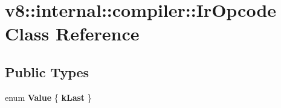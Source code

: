 \hypertarget{classv8_1_1internal_1_1compiler_1_1_ir_opcode}{}\section{v8\+:\+:internal\+:\+:compiler\+:\+:Ir\+Opcode Class Reference}
\label{classv8_1_1internal_1_1compiler_1_1_ir_opcode}
\subsection*{Public Types}
\begin{DoxyCompactItemize}
\item 
enum {\bfseries Value} \{ {\bfseries k\+Last}
 \}\hypertarget{classv8_1_1internal_1_1compiler_1_1_ir_opcode_a12e212665e666e61e7d32a0ae9a31e80}{}\label{classv8_1_1internal_1_1compiler_1_1_ir_opcode_a12e212665e666e61e7d32a0ae9a31e80}

\end{DoxyCompactItemize}
